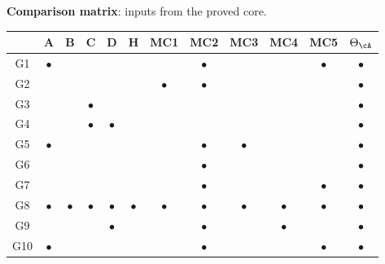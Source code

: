 \medskip

\noindent\textbf{Comparison matrix}: inputs from the proved core.

\begin{center}
\renewcommand{\arraystretch}{1.3}
\small
\begin{tabular}{c|ccccc|ccccc|c}
& \textbf{A} & \textbf{B} & \textbf{C} & \textbf{D} & \textbf{H}
& \textbf{MC1} & \textbf{MC2} & \textbf{MC3} & \textbf{MC4} & \textbf{MC5}
& $\Theta_\cA$ \\
\hline
G1 & $\bullet$ & & & & & & $\bullet$ & & & $\bullet$ & $\bullet$ \\
G2 & & & & & & $\bullet$ & $\bullet$ & & & & $\bullet$ \\
G3 & & & $\bullet$ & & & & & & & & $\bullet$ \\
G4 & & & $\bullet$ & $\bullet$ & & & & & & & $\bullet$ \\
G5 & $\bullet$ & & & & & & $\bullet$ & $\bullet$ & & & $\bullet$ \\
G6 & & & & & & & $\bullet$ & & & & $\bullet$ \\
G7 & & & & & & & $\bullet$ & & & $\bullet$ & $\bullet$ \\
G8 & $\bullet$ & $\bullet$ & $\bullet$ & $\bullet$ & $\bullet$
 & $\bullet$ & $\bullet$ & $\bullet$ & $\bullet$ & $\bullet$
 & $\bullet$ \\
G9 & & & & $\bullet$ & & & $\bullet$ & & $\bullet$ & & $\bullet$ \\
G10 & $\bullet$ & & & & & & $\bullet$ & & & $\bullet$ & $\bullet$
\end{tabular}
\end{center}
